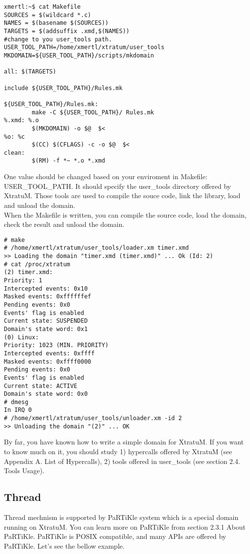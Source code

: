 \begin{verbatim}
xmertl:~$ cat Makefile 
SOURCES = $(wildcard *.c)
NAMES = $(basename $(SOURCES))
TARGETS = $(addsuffix .xmd,$(NAMES))
#change to you user_tools path.
USER_TOOL_PATH=/home/xmertl/xtratum/user_tools
MKDOMAIN=${USER_TOOL_PATH}/scripts/mkdomain

all: $(TARGETS)

include ${USER_TOOL_PATH}/Rules.mk

${USER_TOOL_PATH}/Rules.mk:
        make -C ${USER_TOOL_PATH}/ Rules.mk
%.xmd: %.o
        $(MKDOMAIN) -o $@  $<
%o: %c
        $(CC) $(CFLAGS) -c -o $@  $<
clean:
        $(RM) -f *~ *.o *.xmd
\end{verbatim}

One value should be changed based on your enviroment in Makefile: USER\_TOOL\_PATH. It should specify the user\_tools directory offered by XtratuM. Those tools are used to compile the souce code, link the library, load and unload the domain. 
\\
When the Makefile is written, you can compile the source code, load the domain, check the result and unload the domain.
\begin{verbatim}
# make
# /home/xmertl/xtratum/user_tools/loader.xm timer.xmd
>> Loading the domain "timer.xmd (timer.xmd)" ... Ok (Id: 2)
# cat /proc/xtratum
(2) timer.xmd:
Priority: 1
Intercepted events: 0x10
Masked events: 0xffffffef
Pending events: 0x0
Events' flag is enabled
Current state: SUSPENDED
Domain's state word: 0x1
(0) Linux:
Priority: 1023 (MIN. PRIORITY)
Intercepted events: 0xffff
Masked events: 0xffff0000
Pending events: 0x0
Events' flag is enabled
Current state: ACTIVE
Domain's state word: 0x0
# dmesg
In IRQ 0
# /home/xmertl/xtratum/user_tools/unloader.xm -id 2
>> Unloading the domain "(2)" ... OK
\end{verbatim}
By far, you have known how to write a simple domain for XtratuM. If you want to know much on it, you should study 1) hypercalls offered by XtratuM (see Appendix A. List of Hypercalls), 2) tools offered in user\_tools (see section 2.4. Tools Usage).

\subsection{Thread}

Thread mechnism is supported by PaRTiKle system which is a special domain running on XtratuM. You can learn more on PaRTiKle from section 2.3.1 About PaRTiKle. PaRTiKle is POSIX compatible, and many APIs are offered by PaRTiKle. Let's see the bellow example.

